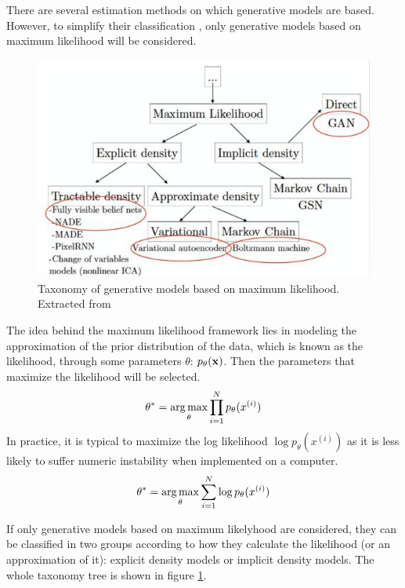 There are several estimation methods on which generative models are based. However, to 
simplify their classification \cite{Goodfellow2016}, only generative models based on 
maximum likelihood will be considered.

\begin{figure}[H]
\centering
\includegraphics[scale=0.618]{pix/dgm/taxonomy_goodfellow.jpeg}
\caption{Taxonomy of generative models based on maximum likelihood. Extracted from \cite{Goodfellow2016}}
\label{fig:taxonomy_generative_models}
\end{figure}

The idea behind the maximum likelihood framework lies in modeling the approximation of 
the prior distribution of the data, which is known as the likelihood, through some 
parameters $\theta$: $p_\theta(\mathbf{x})$. Then the parameters that maximize the likelihood 
will be selected.
\begin{align}
\theta^* = \operatorname*{arg\,max}_\theta \prod_{i=1}^N p_\theta(x^{(i)})
\end{align}
In practice, it is typical to maximize the log likelihood $\log p_\theta(x^{(i)})$ as 
it is less likely to suffer numeric instability when implemented on a computer.
\begin{align}
\theta^* = \operatorname*{arg\,max}_\theta \sum_{i=1}^N \log p_\theta(x^{(i)})
\end{align}

If only generative models based on maximum likelyhood are considered, they can be 
classified in two groups according to how they calculate the likelihood (or an 
approximation of it): explicit density models or implicit density models. The whole 
taxonomy tree is shown in figure \ref{fig:taxonomy_generative_models}.

